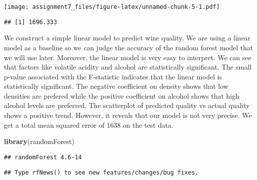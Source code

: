 \documentclass[]{article}
\newenvironment{Shaded}{\begin{snugshade}}{\end{snugshade}}
\newcommand{\KeywordTok}[1]{\textcolor[rgb]{0.13,0.29,0.53}{\textbf{#1}}}
\newcommand{\DataTypeTok}[1]{\textcolor[rgb]{0.13,0.29,0.53}{#1}}
\newcommand{\DecValTok}[1]{\textcolor[rgb]{0.00,0.00,0.81}{#1}}
\newcommand{\StringTok}[1]{\textcolor[rgb]{0.31,0.60,0.02}{#1}}
\newcommand{\OtherTok}[1]{\textcolor[rgb]{0.56,0.35,0.01}{#1}}
\newcommand{\OperatorTok}[1]{\textcolor[rgb]{0.81,0.36,0.00}{\textbf{#1}}}
\newcommand{\NormalTok}[1]{#1}
\begin{document}
\texttt{[image: assignment7\_files/figure-latex/unnamed-chunk-5-1.pdf]}

\begin{Shaded}
\end{Shaded}

\begin{verbatim}
## [1] 1696.333
\end{verbatim}

We construct a simple linear model to predict wine quality. We are using
a linear model as a baseline so we can judge the accuracy of the random
forest model that we will use later. Moreover, the linear model is very
easy to interpret. We can see that factors like volatile acidity and
alcohol are statistically significant. The small p-value associated with
the F-statistic indicates that the linear model is statistically
significant. The negative coefficient on density shows that low
densities are prefered while the positive coefficient on alcohol shows
that high alcohol levels are preferred. The scatterplot of predicted
quality vs actual quality shows a positive trend. However, it reveals
that our model is not very precise. We get a total mean squared error of
1638 on the test data.

\begin{Shaded}
\begin{Highlighting}[]
\KeywordTok{library}\NormalTok{(randomForest)}
\end{Highlighting}
\end{Shaded}

\begin{verbatim}
## randomForest 4.6-14
\end{verbatim}

\begin{verbatim}
## Type rfNews() to see new features/changes/bug fixes.
\end{verbatim}

\begin{Shaded}
\end{Shaded}
\end{document}
